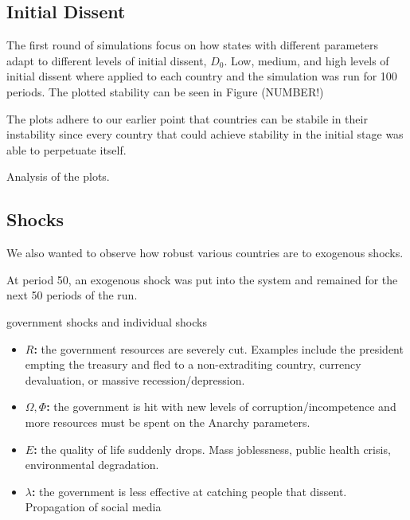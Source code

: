 \documentclass[12pt]{article}
\begin{document}
\begin{spacing}{1.5}
\subsection{Initial Dissent}

The first round of simulations focus on how states with different parameters adapt to different levels of initial dissent, $D_0$. Low, medium, and high levels of initial dissent where applied to each country and the simulation was run for 100 periods. The plotted stability can be seen in Figure (NUMBER!)


The plots adhere to our earlier point that countries can be stabile in their instability since every country that could achieve stability in the initial stage was able to perpetuate itself. 


Analysis of the plots. 

\subsection{Shocks}

We also wanted to observe how robust various countries are to exogenous shocks. 

At period 50, an exogenous shock was put into the system and remained for the next 50 periods of the run. 

government shocks and individual shocks 

\begin{itemize}
	\item \textbf{$R$:} the government resources are severely cut. Examples include the president empting the treasury and fled to a non-extraditing country, currency devaluation, or massive recession/depression. 
	\item \textbf{$\Omega,\Phi$:} the government is hit with new levels of corruption/incompetence and more resources must be spent on the Anarchy parameters. 
	\item \textbf{$E$:} the quality of life suddenly drops. Mass joblessness, public health crisis, environmental degradation. 
	\item \textbf{$\lambda$:} the government is less effective at catching people that dissent. Propagation of social media    
\end{itemize}



\end{spacing}
\end{document}

